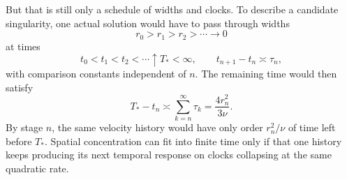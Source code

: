 But that is still only a schedule of widths and clocks. To describe a candidate singularity, one actual solution would have to pass through widths
\[
  r_0>r_1>r_2>\cdots\longrightarrow0
\]
at times
\[
  t_0<t_1<t_2<\cdots\uparrow T_*<\infty,
  \qquad
  t_{n+1}-t_n\asymp\tau_n,
\]
with comparison constants independent of \(n\). The remaining time would then satisfy
\[
  T_*-t_n
  \asymp
  \sum_{k=n}^{\infty}\tau_k
  =
  \frac{4r_n^2}{3\nu}.
\]
By stage \(n\), the same velocity history would have only order \(r_n^2/\nu\) of time left before \(T_*\). Spatial concentration can fit into finite time only if that one history keeps producing its next temporal response on clocks collapsing at the same quadratic rate.